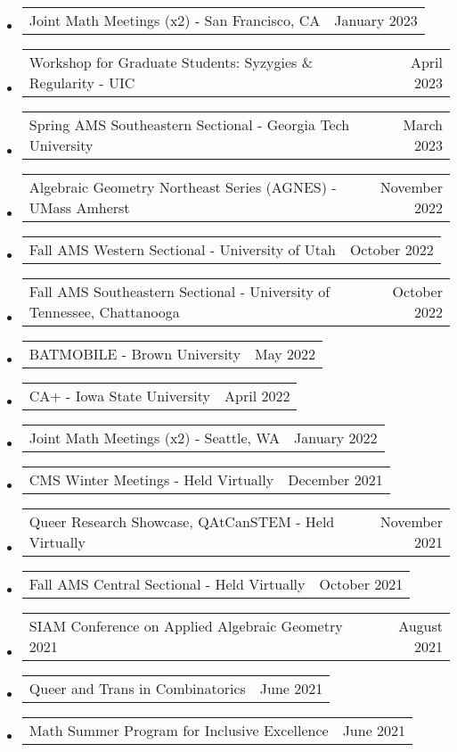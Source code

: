 \documentclass[letterpaper,11pt]{article}
\makeatletter
\newcommand{\ressubheadingTalk}[2]{
\begin{tabular*}{6.5in}[t]{l@{\cftdotfill{\cftsecdotsep}\extracolsep{\fill}}r}
		#1 & #2 \\
\end{tabular*}\vspace{-6pt}}
\makeatother
\begin{document}
\begin{itemize}
\item
	\ressubheadingTalk{Joint Math Meetings (x2) - San Francisco, CA}{January 2023}

\item
	\ressubheadingTalk{Workshop for Graduate Students: Syzygies \& Regularity - UIC}{April 2023}

\item
	\ressubheadingTalk{Spring AMS Southeastern Sectional - Georgia Tech University}{March 2023}
	
\item
	\ressubheadingTalk{Algebraic Geometry Northeast Series (AGNES) - UMass Amherst}{November 2022}
	
\item
	\ressubheadingTalk{Fall AMS Western Sectional - University of Utah}{October 2022}
	
\item
	\ressubheadingTalk{Fall AMS Southeastern Sectional - University of Tennessee, Chattanooga}{October 2022}
	
\item
	\ressubheadingTalk{BATMOBILE - Brown University}{May 2022}
	
\item
	\ressubheadingTalk{CA+ - Iowa State University}{April 2022}

\item
	\ressubheadingTalk{Joint Math Meetings (x2) - Seattle, WA}{January 2022}\footnotemark[2]

\item
	\ressubheadingTalk{CMS Winter Meetings - Held Virtually}{December 2021}
		
\item
	\ressubheadingTalk{Queer Research Showcase, QAtCanSTEM  - Held Virtually}{November 2021}
	
\item
	\ressubheadingTalk{Fall AMS Central Sectional - Held Virtually}{October 2021}
	
\item
	\ressubheadingTalk{SIAM Conference on Applied Algebraic Geometry 2021}{August 2021}

\item
	\ressubheadingTalk{Queer and Trans in Combinatorics}{June 2021}
		
\item
	\ressubheadingTalk{Math Summer Program for Inclusive Excellence}{June 2021}
	

\end{itemize}
\end{document}
